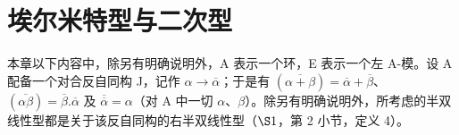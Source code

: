 \section{埃尔米特型与二次型}

本章以下内容中，除另有明确说明外，A 表示一个环，E 表示一个左 A-模。设 A 配备一个对合反自同构 J，记作 \(\alpha \to \overline{\alpha}\)；于是有 \((\overline{\alpha + \beta}) = \overline{\alpha} + \overline{\beta}\)、\((\overline{\alpha\beta}) = \overline{\beta}.\overline{\alpha}\) 及 \(\overline{\overline{\alpha}} = \alpha\)（对 A 中一切 \(\alpha\)、\(\beta\)）。除另有明确说明外，所考虑的半双线性型都是关于该反自同构的右半双线性型（\(\S 1\)，第 2 小节，定义 4）。

